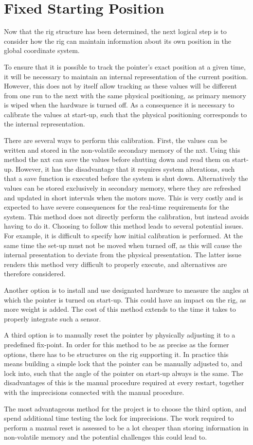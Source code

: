 \section{Fixed Starting Position}
Now that the rig structure has been determined, the next logical step is to consider how the rig can maintain information about its own position in the global coordinate system. 

To ensure that it is possible to track the pointer's exact position at a given time, it will be necessary to maintain an internal representation of the current position. However, this does not by itself allow tracking as these values will be different from one run to the next with the same physical positioning, as primary memory is wiped when the hardware is turned off. As a consequence it is necessary to calibrate the values at start-up, such that the physical positioning corresponds to the internal representation.

There are several ways to perform this calibration. First, the values can be written and stored in the non-volatile secondary memory of the \gls{nxt}. Using this method the \gls{nxt} can save the values before shutting down and read them on start-up. However, it has the disadvantage that it requires system alterations, such that a save function is executed before the system is shut down. Alternatively the values can be stored exclusively in secondary memory, where they are refreshed and updated in short intervals when the motors move. This is very costly and is expected to have severe consequences for the real-time requirements for the system. This method does not directly perform the calibration, but instead avoids having to do it. Choosing to follow this method leads to several potential issues. For example, it is difficult to specify how initial calibration is performed. At the same time the set-up must not be moved when turned off, as this will cause the internal presentation to deviate from the physical presentation. The latter issue renders this method very difficult to properly execute, and alternatives are therefore considered.

Another option is to install and use designated hardware to measure the angles at which the pointer is turned on start-up. This could have an impact on the rig, as more weight is added. The cost of this method extends to the time it takes to properly integrate such a sensor.

A third option is to manually reset the pointer by physically adjusting it to a predefined fix-point. In order for this method to be as precise as the former options, there has to be structures on the rig supporting it. In practice this means building a simple lock that the pointer can be manually adjusted to, and lock into, such that the angle of the pointer on start-up always is the same. The disadvantages of this is the manual procedure required at every restart, together with the imprecisions connected with the manual procedure.

The most advantageous method for the project is to choose the third option, and spend additional time testing the lock for imprecisions. The work required to perform a manual reset is assessed to be a lot cheaper than storing information in non-volatile memory and the potential challenges this could lead to.